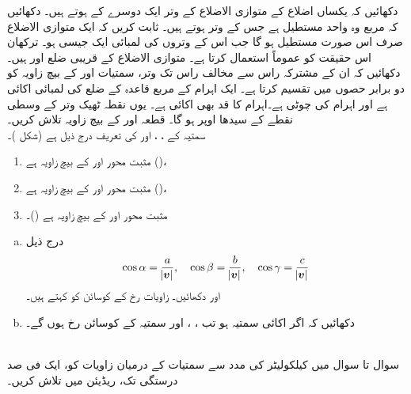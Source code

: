 %
دکھائیں کہ یکساں اضلاع کے متوازی الاضلاع کے وتر ایک دوسرے کے   ہوتے ہیں۔ 
دکھائیں کہ مربع وہ واحد مستطیل ہے جس کے وتر  ہوتے ہیں۔
ثابت کریں کہ ایک متوازی الاضلاع صرف  اس صورت مستطیل ہو گا جب اس کے وتروں  کی لمبائی ایک جیسی ہو۔ ترکھان اس حقیقت کو عموماً استعمال کرتا ہے۔
متوازی الاضلاع کے قریبی ضلع  اور  ہیں۔ دکھائیں کہ ان کے مشترکہ راس سے مخالف راس تک وتر، سمتیات   اور  کے بیچ زاویہ کو دو برابر حصوں میں تقسیم کرتا ہے۔ 
ایک اہرام کے مربع قاعدہ  کے ضلع  کی لمبائی  اکائی   ہے  اور اہرام کی چوٹی  ہے۔اہرام کا قد بھی  اکائی   ہے۔ یوں نقطہ   ٹھیک وتر  کے وسطی نقطے کے سیدھا اوپر  ہو گا۔ قطعہ  اور  کے بیچ زاویہ تلاش کریں۔
\\
سمتیہ  کے ،  ، اور  کی تعریف درج ذیل ہے (شکل )۔
\begin{enumerate}[]
\item
مثبت محور  اور  کے بیچ زاویہ  ہے ()،
\item
مثبت محور  اور  کے بیچ زاویہ  ہے ()،
\item
مثبت محور  اور  کے بیچ زاویہ  ہے ()۔
\end{enumerate}
\begin{enumerate}[a.]
\item
درج ذیل
\begin{align*}
\cos\alpha=\frac{a}{\abs{{{\boldsymbol{v}}}}},\quad \cos\beta=\frac{b}{\abs{{{\boldsymbol{v}}}}},\quad \cos\gamma=\frac{c}{\abs{{{\boldsymbol{v}}}}}
\end{align*} 
اور  دکھائیں۔ زاویات رخ کے  کوسائن کو  کہتے ہیں۔
\item
{} دکھائیں کہ اگر   اکائی سمتیہ ہو تب ، ،  اور  سمتیہ  کے کوسائن رخ ہوں گے۔
\end{enumerate}
%
\\
سوال  تا سوال  میں کیلکولیٹر کی مدد سے سمتیات کے درمیان  زاویات کو، ایک فی صد درستگی تک، ریڈیئن میں  تلاش کریں۔

